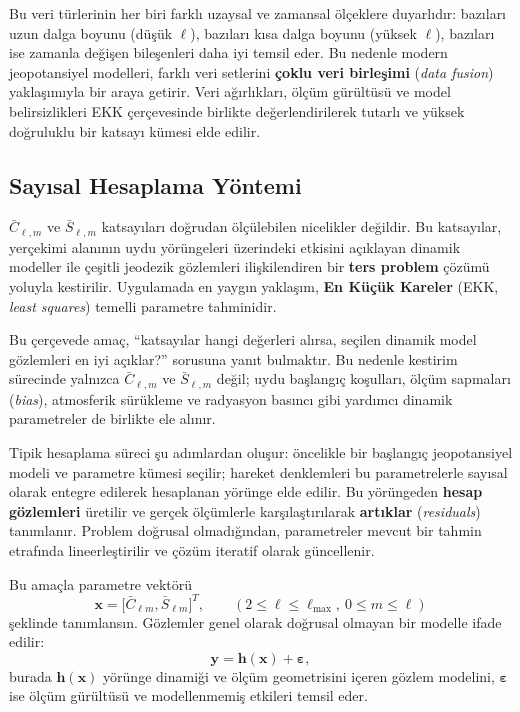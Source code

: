 Bu veri türlerinin her biri farklı uzaysal ve zamansal ölçeklere duyarlıdır: bazıları uzun dalga boyunu (düşük $\ell$), bazıları kısa dalga boyunu (yüksek $\ell$), bazıları ise zamanla değişen bileşenleri daha iyi temsil eder. Bu nedenle modern jeopotansiyel modelleri, farklı veri setlerini \textbf{çoklu veri birleşimi} (\emph{data fusion}) yaklaşımıyla bir araya getirir. Veri ağırlıkları, ölçüm gürültüsü ve model belirsizlikleri EKK çerçevesinde birlikte değerlendirilerek tutarlı ve yüksek doğruluklu bir katsayı kümesi elde edilir.


\subsection{Sayısal Hesaplama Yöntemi}

$\bar C_{\ell,m}$ ve $\bar S_{\ell,m}$ katsayıları doğrudan ölçülebilen nicelikler değildir.
Bu katsayılar, yerçekimi alanının uydu yörüngeleri üzerindeki etkisini açıklayan
dinamik modeller ile çeşitli jeodezik gözlemleri ilişkilendiren bir
\textbf{ters problem} çözümü yoluyla kestirilir.
Uygulamada en yaygın yaklaşım, \textbf{En Küçük Kareler}
(EKK, \emph{least squares}) temelli parametre tahminidir.

Bu çerçevede amaç,
``katsayılar hangi değerleri alırsa, seçilen dinamik model gözlemleri en iyi açıklar?''
sorusuna yanıt bulmaktır.
Bu nedenle kestirim sürecinde yalnızca
$\bar C_{\ell,m}$ ve $\bar S_{\ell,m}$ değil;
uydu başlangıç koşulları, ölçüm sapmaları (\emph{bias}),
atmosferik sürükleme ve radyasyon basıncı gibi
yardımcı dinamik parametreler de birlikte ele alınır.

Tipik hesaplama süreci şu adımlardan oluşur:
öncelikle bir başlangıç jeopotansiyel modeli ve parametre kümesi seçilir;
hareket denklemleri bu parametrelerle sayısal olarak entegre edilerek
hesaplanan yörünge elde edilir.
Bu yörüngeden \textbf{hesap gözlemleri} üretilir ve gerçek ölçümlerle
karşılaştırılarak \textbf{artıklar} (\emph{residuals}) tanımlanır.
Problem doğrusal olmadığından, parametreler mevcut bir tahmin etrafında
lineerleştirilir ve çözüm iteratif olarak güncellenir.

Bu amaçla parametre vektörü
\[
\mathbf{x}=
\big[\bar{C}_{\ell m},\bar{S}_{\ell m}\big]^T,
\qquad
(2\le \ell\le \ell_{\max},\ 0\le m\le \ell)
\]
şeklinde tanımlansın.
Gözlemler genel olarak doğrusal olmayan bir modelle ifade edilir:
\begin{equation}
\mathbf{y}= \mathbf{h}(\mathbf{x})+\boldsymbol{\varepsilon},
\label{eq:obs_model}
\end{equation}
burada $\mathbf{h}(\mathbf{x})$ yörünge dinamiği ve ölçüm geometrisini içeren
gözlem modelini,
$\boldsymbol{\varepsilon}$ ise ölçüm gürültüsü ve modellenmemiş etkileri temsil eder.

